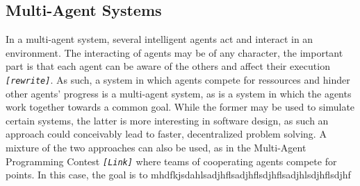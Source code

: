 
\subsection{Multi-Agent Systems}

In a multi-agent system, several intelligent agents act and interact
in an environment. The interacting of agents may be of any character,
the important part is that each agent can be aware of the others and
affect their execution \texttt{\emph{{[}rewrite{]}}}. As such, a system
in which agents compete for ressources and hinder other agents' progress
is a multi-agent system, as is a system in which the agents work together
towards a common goal. While the former may be used to simulate certain
systems, the latter is more interesting in software design, as such
an approach could conceivably lead to faster, decentralized problem
solving. A mixture of the two approaches can also be used, as in the
Multi-Agent Programming Contest \texttt{\emph{{[}Link{]}}} where teams
of cooperating agents compete for points. In this case, the goal is
to mhdfkjsdahlsadjhflsadjhflsdjhflsadjhlsdjhflsdjhf
